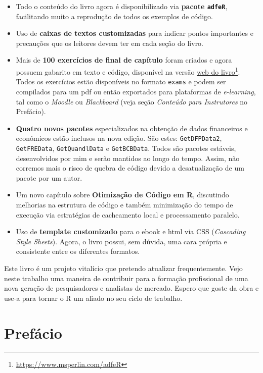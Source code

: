 \documentclass[
  11pt,
]{book}
\begin{document}
\begin{itemize}
\item
  Todo o conteúdo do livro agora é disponibilizado via \textbf{pacote \texttt{adfeR}}, facilitando muito a reprodução de todos os exemplos de código.
\item
  Uso de \textbf{caixas de textos customizadas} para indicar pontos importantes e precauções que os leitores devem ter em cada seção do livro.
\item
  Mais de \textbf{100 exercícios de final de capítulo} foram criados e agora possuem gabarito em texto e código, disponível na versão \href{https://www.msperlin.com/adfeR}{web do livro}\footnote{\url{https://www.msperlin.com/adfeR}}. Todos os exercícios estão disponíveis no formato \texttt{exams} \citep{R-exams} e podem ser compilados para um pdf ou então exportados para plataformas de \emph{e-learning}, tal como o \emph{Moodle} ou \emph{Blackboard} (veja seção \emph{Conteúdo para Instrutores} no Prefácio).
\item
  \textbf{Quatro novos pacotes} especializados na obtenção de dados financeiros e econômicos estão inclusos na nova edição. São estes: \texttt{GetDFPData2}, \texttt{GetFREData}, \texttt{GetQuandlData} e \texttt{GetBCBData}. Todos são pacotes estáveis, desenvolvidos por mim e serão mantidos ao longo do tempo. Assim, não corremos mais o risco de quebra de código devido a desatualização de um pacote por um autor.
\item
  Um novo capítulo sobre \textbf{Otimização de Código em R}, discutindo melhorias na estrutura de código e também minimização do tempo de execução via estratégias de cacheamento local e processamento paralelo.
\item
  Uso de \textbf{template customizado} para o ebook e html via CSS (\emph{Cascading Style Sheets}). Agora, o livro possui, sem dúvida, uma cara própria e consistente entre os diferentes formatos.
\end{itemize}

Este livro é um projeto vitalício que pretendo atualizar frequentemente. Vejo neste trabalho uma maneira de contribuir para a formação profissional de uma nova geração de pesquisadores e analistas de mercado. Espero que goste da obra e use-a para tornar o R um aliado no seu ciclo de trabalho.

\hypertarget{prefuxe1cio}{%
\chapter*{Prefácio}\label{prefuxe1cio}}
\end{document}
